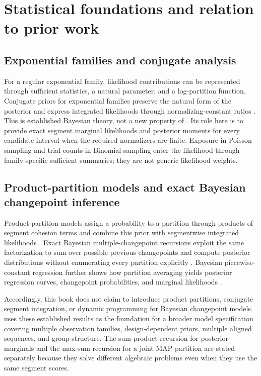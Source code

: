 \chapter{Statistical foundations and relation to prior work}
\label{ch:lineage}

\section{Exponential families and conjugate analysis}
For a regular exponential family, likelihood contributions can be represented through sufficient
statistics, a natural parameter, and a log-partition function. Conjugate priors for exponential
families preserve the natural form of the posterior and express integrated likelihoods through
normalizing-constant ratios \citep{diaconis1979conjugate,bernardo1994bayesian}. This is established
Bayesian theory, not a new property of \BayesBreak. Its role here is to provide exact segment
marginal likelihoods and posterior moments for every candidate interval when the required
normalizers are finite. Exposure in Poisson sampling and trial counts in Binomial sampling enter the
likelihood through family-specific sufficient summaries; they are not generic likelihood weights.

\section{Product-partition models and exact Bayesian changepoint inference}
Product-partition models assign a probability to a partition through products of segment cohesion
terms and combine this prior with segmentwise integrated likelihoods
\citep{barry1992ppm,barry1993bayesCP}. Exact Bayesian multiple-changepoint recursions exploit the
same factorization to sum over possible previous changepoints and compute posterior distributions
without enumerating every partition explicitly \citep{fearnhead2006exact}. Bayesian
piecewise-constant regression further shows how partition averaging yields posterior regression
curves, changepoint probabilities, and marginal likelihoods \citep{hutter2006bpcr}.

Accordingly, this book does not claim to introduce product partitions, conjugate segment
integration, or dynamic programming for Bayesian changepoint models. \BayesBreak uses these
established results as the foundation for a broader model specification covering multiple
observation families, design-dependent priors, multiple aligned sequences, and group structure.
The sum-product recursion for posterior marginals and the max-sum recursion for a joint MAP
partition are stated separately because they solve different algebraic problems even when they use
the same segment scores.


